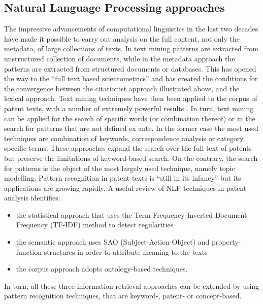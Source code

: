 \documentclass[]{book}
\providecommand{\tightlist}{%
  \setlength{\itemsep}{0pt}\setlength{\parskip}{0pt}}
\begin{document}
\subsection{Natural Language Processing
approaches}\label{natural-language-processing-approaches}

The impressive advancements of computational linguistics in the last two
decades have made it possible to carry out analysis on the full content,
not only the metadata, of large collections of texts. In text mining
patterns are extracted from unstructured collection of documents, while
in the metadata approach the patterns are extracted from structured
documents or databases. This has opened the way to the ``full text based
scientometrics'' \citep{boyack2013improving} and has created the
conditions for the convergence between the citationist approach
illustrated above, and the lexical approach. Text mining techniques have
then been applied to the corpus of patent texts, with a number of
extremely powerful results
\citetext{\citealp[\citet{joung2017monitoring},
\citet{kreuchauff2017patent},
\citet{ozcan2017patent}]{tseng2007text}; \citealp{yoon2012detecting}}.
In turn, text mining can be applied for the search of specific words (or
combination thereof) or in the search for patterns that are not defined
ex ante. In the former case the most used techniques are combination of
keywords, correspondence analysis or category specific terms. These
approaches expand the search over the full text of patents but preserve
the limitations of keyword-based search. On the contrary, the search for
patterns is the object of the most largely used technique, namely topic
modelling. Pattern recognition in patent texts is ``still in its
infancy'' \citep{madani2016evolution} but its applications are growing
rapidly. A useful review of NLP techniques in patent analysis
\citep{madani2016evolution} identifies:

\begin{itemize}
\tightlist
\item
  the statistical approach that uses the Term Frequency-Inverted
  Document Frequency (TF-IDF) method to detect regularities
\item
  the semantic approach uses SAO (Subject-Action-Object) and
  property-function structures in order to attribute meaning to the
  texts
\item
  the corpus approach adopts ontology-based techniques.
\end{itemize}

In turn, all these three information retrieval approaches can be
extended by using pattern recognition techniques, that are keyword-,
patent- or concept-based.
\end{document}
